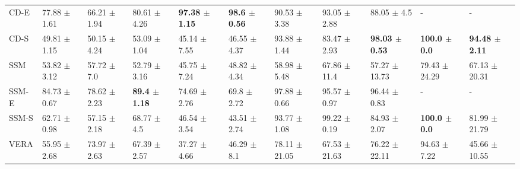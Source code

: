 \begin{tabular}{lllllllllll}
CD-E &            77.88 {\footnotesize $\pm$ 1.61} &             66.21 {\footnotesize $\pm$ 1.94} &            80.61 {\footnotesize $\pm$ 4.26} &  \bfseries{97.38 {\footnotesize $\pm$ 1.15}} &  \bfseries{98.6 {\footnotesize $\pm$ 0.56}} &             90.53 {\footnotesize $\pm$ 3.38} &             93.05 {\footnotesize $\pm$ 2.88} &              88.05 {\footnotesize $\pm$ 4.5} &                                           - &                                            - \\
CD-S &            49.81 {\footnotesize $\pm$ 1.15} &             50.15 {\footnotesize $\pm$ 4.24} &            53.09 {\footnotesize $\pm$ 1.04} &             45.14 {\footnotesize $\pm$ 7.55} &            46.55 {\footnotesize $\pm$ 4.37} &             93.88 {\footnotesize $\pm$ 1.44} &             83.47 {\footnotesize $\pm$ 2.93} &  \bfseries{98.03 {\footnotesize $\pm$ 0.53}} &  \bfseries{100.0 {\footnotesize $\pm$ 0.0}} &  \bfseries{94.48 {\footnotesize $\pm$ 2.11}} \\
\midrule
SSM    &            53.82 {\footnotesize $\pm$ 3.12} &              57.72 {\footnotesize $\pm$ 7.0} &            52.79 {\footnotesize $\pm$ 3.16} &             45.75 {\footnotesize $\pm$ 7.24} &            48.82 {\footnotesize $\pm$ 4.34} &             58.98 {\footnotesize $\pm$ 5.48} &             67.86 {\footnotesize $\pm$ 11.4} &            57.27 {\footnotesize $\pm$ 13.73} &           79.43 {\footnotesize $\pm$ 24.29} &            67.13 {\footnotesize $\pm$ 20.31} \\
SSM-E  &            84.73 {\footnotesize $\pm$ 0.67} &             78.62 {\footnotesize $\pm$ 2.23} &  \bfseries{89.4 {\footnotesize $\pm$ 1.18}} &             74.69 {\footnotesize $\pm$ 2.76} &             69.8 {\footnotesize $\pm$ 2.72} &             97.88 {\footnotesize $\pm$ 0.66} &             95.57 {\footnotesize $\pm$ 0.97} &             96.44 {\footnotesize $\pm$ 0.83} &                                           - &                                            - \\
SSM-S  &            62.71 {\footnotesize $\pm$ 0.98} &             57.15 {\footnotesize $\pm$ 2.18} &             68.77 {\footnotesize $\pm$ 4.5} &             46.54 {\footnotesize $\pm$ 3.54} &            43.51 {\footnotesize $\pm$ 2.74} &             93.77 {\footnotesize $\pm$ 1.08} &             99.22 {\footnotesize $\pm$ 0.19} &             84.93 {\footnotesize $\pm$ 2.07} &  \bfseries{100.0 {\footnotesize $\pm$ 0.0}} &            81.99 {\footnotesize $\pm$ 21.79} \\
\midrule
VERA   &            55.95 {\footnotesize $\pm$ 2.68} &             73.97 {\footnotesize $\pm$ 2.63} &            67.39 {\footnotesize $\pm$ 2.57} &             37.27 {\footnotesize $\pm$ 4.66} &             46.29 {\footnotesize $\pm$ 8.1} &            78.11 {\footnotesize $\pm$ 21.05} &            67.53 {\footnotesize $\pm$ 21.63} &            76.22 {\footnotesize $\pm$ 22.11} &            94.63 {\footnotesize $\pm$ 7.22} &            45.66 {\footnotesize $\pm$ 10.55} \\

\end{tabular}
